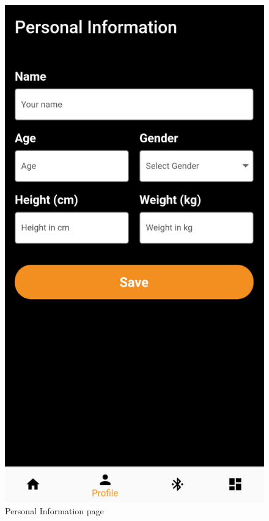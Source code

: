 \documentclass[a4paper]{scrreprt}
\begin{document}
\begin{figure}[h]
  \centering
  \includegraphics[scale=0.43]{personal_info.png}
  \caption{Personal Information page}
  \label{fig:personal-info}
\end{figure}
\clearpage
\end{document}
